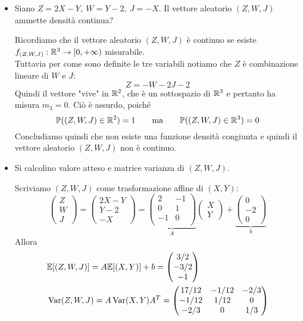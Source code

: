 \begin{itemize}
\item [(d)] Siano $Z=2X-Y,\ W=Y-2,\ J=-X$. Il vettore aleatorio $(Z,W,J)$ ammette densità continua?

Ricordiamo che il vettore aleatorio $(Z,W,J)$ è continuo se esiste $f_{(Z,W,J)}:\mathbb{R}^3\to[0,+\infty)$ misurabile. \\
Tuttavia per come sono definite le tre variabili notiamo che $Z$ è combinazione lineare di $W$ e $J$:
\[
Z=-W-2J-2
\]
Quindi il vettore "vive" in $\mathbb{R}^2$, che è un sottospazio di $\mathbb{R}^3$ e pertanto ha misura $m_3=0$. Ciò è assurdo, poiché
\[
\mathbb{P}((Z,W,J)\in\mathbb{R}^2)=1\qquad\text{ma}\qquad\mathbb{P}((Z,W,J)\in\mathbb{R}^3)=0
\]
Concludiamo quindi che non esiste una funzione densità congiunta e quindi il vettore aleatorio $(Z,W,J)$ non è continuo.

\item [(e)] Si calcolino valore atteso e matrice varianza di $(Z,W,J)$.

Scriviamo $(Z,W,J)$ come trasformazione affine di $(X,Y)$:
\[
\begin{pmatrix}
Z \\
W \\ J
\end{pmatrix}=
\begin{pmatrix}
2X-Y \\Y-2
 \\-X
\end{pmatrix} =\underbrace{\begin{pmatrix}
2 & -1 \\
 0&1  \\
 -1&0  \\
\end{pmatrix}}_{A}\begin{pmatrix}
X \\
Y
\end{pmatrix}+\underbrace{\begin{pmatrix}
0 \\
-2 \\ 0
\end{pmatrix}}_{b}
\]
Allora
\begin{gather*}
\begin{aligned}
&\mathbb{E}[(Z,W,J)]=A\mathbb{E}[(X,Y)]+b=\begin{pmatrix} 3/2 \\ -3/2  \\-1 \end{pmatrix}   \\
&\operatorname{Var}(Z,W,J)=A\operatorname{Var}(X,Y)A^T=\begin{pmatrix}
17/12 & -1/12 & -2/3 \\
-1/12 &  1/12& 0 \\
 -2/3& 0 & 1/3 \\
\end{pmatrix}
\end{aligned}
\end{gather*}


\end{itemize}
